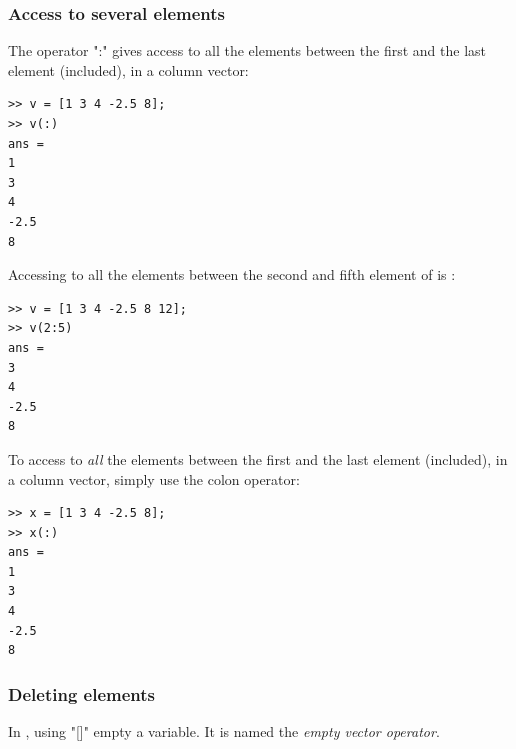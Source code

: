 
		\subsubsection{Access to several elements}
			The operator ":" gives access to all the elements between the first and the last element (included), in a column vector:
\begin{lstlisting}
>> v = [1 3 4 -2.5 8];
>> v(:)
ans = 
1
3
4
-2.5
8
\end{lstlisting}
			Accessing to all the elements between the second and fifth element of  is :
\begin{lstlisting}
>> v = [1 3 4 -2.5 8 12];
>> v(2:5)
ans = 
3
4
-2.5
8
\end{lstlisting}
			To access to \emph{all} the elements between the first and the last element (included), in a column vector, simply use the colon operator:
\begin{lstlisting}
>> x = [1 3 4 -2.5 8];
>> x(:)
ans = 
1
3
4
-2.5
8
\end{lstlisting}

		\subsubsection{Deleting elements}
			In \matlab, using "[]" empty a variable. It is named the \emph{empty vector operator}.
				
